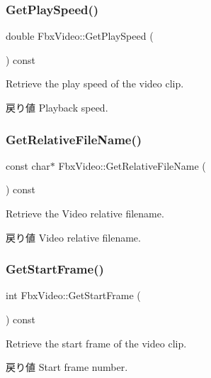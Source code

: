 \subsubsection{\texorpdfstring{Get\+Play\+Speed()}{GetPlaySpeed()}}
{\footnotesize\ttfamily double Fbx\+Video\+::\+Get\+Play\+Speed (\begin{DoxyParamCaption}{ }\end{DoxyParamCaption}) const}

Retrieve the play speed of the video clip. \begin{DoxyReturn}{戻り値}
Playback speed. 
\end{DoxyReturn}
\mbox{\label{class_fbx_video_a5c99c225a47e6aae4cd3028f2737babb}} 
\subsubsection{\texorpdfstring{Get\+Relative\+File\+Name()}{GetRelativeFileName()}}
{\footnotesize\ttfamily const char$\ast$ Fbx\+Video\+::\+Get\+Relative\+File\+Name (\begin{DoxyParamCaption}{ }\end{DoxyParamCaption}) const}

Retrieve the Video relative filename. \begin{DoxyReturn}{戻り値}
Video relative filename. 
\end{DoxyReturn}
\mbox{\label{class_fbx_video_ab634605d67edca645b11d575b04e42ff}} 
\subsubsection{\texorpdfstring{Get\+Start\+Frame()}{GetStartFrame()}}
{\footnotesize\ttfamily int Fbx\+Video\+::\+Get\+Start\+Frame (\begin{DoxyParamCaption}{ }\end{DoxyParamCaption}) const}

Retrieve the start frame of the video clip. \begin{DoxyReturn}{戻り値}
Start frame number. 
\end{DoxyReturn}
\mbox{\label{class_fbx_video_a8b6b7be05e339cfe47998674269242e7}} 
